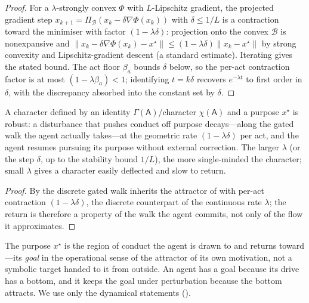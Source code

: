 \documentclass[11pt,twocolumn,a4paper]{article}
\newcommand{\Agent}{\mathsf{A}}
\newcommand{\Self}{\Gamma}          %
\newcommand{\floorc}{\beta}          %
\newcommand{\Char}{\chi}             %
\newcommand{\Beh}{\mathcal{B}}       %
\newcommand{\norm}[1]{\lVert#1\rVert}
\begin{document}
\begin{proof}
For a $\lambda$-strongly convex $\Phi$ with $L$-Lipschitz gradient, the
projected gradient step $x_{k+1}=\Pi_\Beh(x_k-\delta\nabla\Phi(x_k))$ with
$\delta\le1/L$ is a contraction toward the minimiser with factor
$(1-\lambda\delta)$: projection onto the convex $\Beh$ is nonexpansive and
$\norm{x_k-\delta\nabla\Phi(x_k)-x^\star}\le(1-\lambda\delta)
\norm{x_k-x^\star}$ by strong convexity and Lipschitz-gradient descent
(a standard estimate). Iterating gives the stated bound. The act floor
$\floorc_a$ bounds $\delta$ below, so the per-act contraction factor is at
most $(1-\lambda\floorc_a)<1$; identifying $t=k\delta$ recovers
$e^{-\lambda t}$ to first order in $\delta$, with the discrepancy absorbed
into the constant set by $\delta$.
\end{proof}

\begin{corollary}
\label{cor:robust}
A character defined by an identity $\Self(\Agent)$/character
$\Char(\Agent)$ and a purpose $x^\star$ is robust: a disturbance that
pushes conduct off purpose decays---along the gated walk the agent actually
takes---at the geometric rate $(1-\lambda\delta)$ per act, and the agent
resumes pursuing its purpose without external correction. The larger
$\lambda$ (or the step $\delta$, up to the stability bound $1/L$), the more
single-minded the character; small $\lambda$ gives a character easily
deflected and slow to return.
\end{corollary}

\begin{proof}
By  the discrete gated walk inherits the attractor of
 with per-act contraction $(1-\lambda\delta)$, the
discrete counterpart of the continuous rate $\lambda$; the return is
therefore a property of the walk the agent commits, not only of the flow it
approximates.
\end{proof}

\begin{remark}
The purpose $x^\star$ is the region of conduct the agent is drawn to and
returns toward---its \emph{goal} in the operational sense of the attractor
of its own motivation, not a symbolic target handed to it from outside.
An agent has a goal because its drive has a bottom, and it keeps the goal
under perturbation because the bottom attracts. We use only the dynamical
statements ().
\end{remark}
\end{document}
